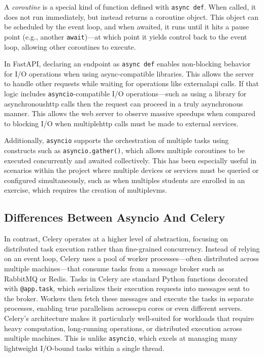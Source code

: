     A \textit{coroutine} is a special kind of function defined with \texttt{async def}. When called, it does not run immediately, 
    but instead returns a coroutine object. This object can be scheduled by the event loop, and when awaited, it runs until it 
    hits a pause point (e.g., another \texttt{await})—at which point it yields control back to the event loop, allowing other 
    coroutines to execute.

    In FastAPI, declaring an endpoint as \texttt{async def} enables non-blocking behavior for I/O operations when using 
    async-compatible libraries. This allows the server to handle other requests while waiting for operations like 
    external\ac{api} calls. If that logic includes \texttt{asyncio}-compatible I/O operations—such as using a 
    library for asynchronous\ac{http} calls then the request can proceed in a truly asynchronous manner. This 
    allows the web server to observe massive speedups when compared to blocking I/O when multiple\ac{http} calls 
    must be made to external services.

    Additionally, \texttt{asyncio} supports the orchestration of multiple tasks using constructs such as \texttt{asyncio.gather()}, 
    which allows multiple coroutines to be executed concurrently and awaited collectively. This has been especially useful in 
    scenarios within the project where multiple devices or services must be queried or configured simultaneously, such as 
    when multiples students are enrolled in an exercise, which requires the creation of multiple\ac{vm}s.

    \subsection{Differences Between Asyncio And Celery}

        In contrast, Celery operates at a higher level of abstraction, focusing on distributed task execution rather 
        than fine-grained concurrency. Instead of relying on an event loop, Celery uses a pool of worker 
        processes—often distributed across multiple machines—that consume tasks from a message broker such as RabbitMQ 
        or Redis. Tasks in Celery are standard Python functions decorated with \texttt{@app.task}, which serializes their 
        execution requests into messages sent to the broker. Workers then fetch these messages and execute the tasks 
        in separate processes, enabling true parallelism across\ac{cpu} cores or even different servers. Celery's 
        architecture makes it particularly well-suited for workloads that require heavy computation, long-running 
        operations, or distributed execution across multiple machines. This is unlike \texttt{asyncio}, which excels at managing many 
        lightweight I/O-bound tasks within a single thread.

